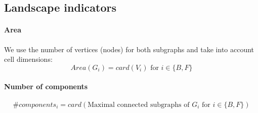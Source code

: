 
\subsection{Landscape indicators}
\label{sec:appendix_wildland__indicators}

\paragraph{Area}
We use the number of vertices (nodes) for both subgraphs and take into account cell dimensions: 
\begin{equation}
    Area(G_i) =card(V_i) \text{ for } i\in\{B,F\}
    \label{eq:area}
\end{equation}

\paragraph{Number of components}

\begin{equation}
    \# components_i = card(\text{Maximal connected subgraphs of } G_i \text{ for } i \in \{B,F\})
    \label{eq:components}
\end{equation}




